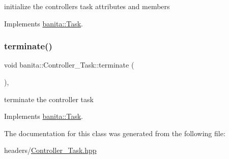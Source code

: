 initialize the controller\textquotesingle{}s task attributes and members 



Implements \mbox{\hyperlink{classbanita_1_1_task_a34578cdd41899a338ac09fec3a285487}{banita\+::\+Task}}.

\mbox{\label{classbanita_1_1_controller___task_a6d1e35ea53bb0dcb64d579937dc7d5f4}} 
\subsubsection{\texorpdfstring{terminate()}{terminate()}}
{\footnotesize\ttfamily void banita\+::\+Controller\+\_\+\+Task\+::terminate (\begin{DoxyParamCaption}{ }\end{DoxyParamCaption})\hspace{0.3cm}{\ttfamily [override]}, {\ttfamily [virtual]}}



terminate the controller task 



Implements \mbox{\hyperlink{classbanita_1_1_task_acccbd449402b1e9ce1ba34c26333a1b6}{banita\+::\+Task}}.



The documentation for this class was generated from the following file\+:\begin{DoxyCompactItemize}
\item 
headers/\mbox{\hyperlink{_controller___task_8hpp}{Controller\+\_\+\+Task.\+hpp}}\end{DoxyCompactItemize}
